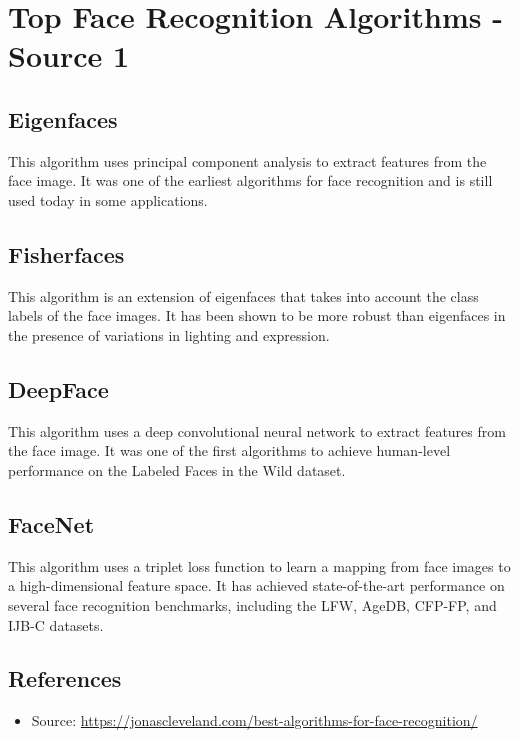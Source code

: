 \documentclass[11pt]{article}
\begin{document}



\tableofcontents
\thispagestyle{empty}
\clearpage

\setcounter{page}{1}

\section*{Top Face Recognition Algorithms - Source 1}

\subsection*{Eigenfaces}
This algorithm uses principal component analysis to extract features from the face image. It was one of the earliest algorithms for face recognition and is still used today in some applications.

\subsection*{Fisherfaces}
This algorithm is an extension of eigenfaces that takes into account the class labels of the face images. It has been shown to be more robust than eigenfaces in the presence of variations in lighting and expression.

\subsection*{DeepFace}
This algorithm uses a deep convolutional neural network to extract features from the face image. It was one of the first algorithms to achieve human-level performance on the Labeled Faces in the Wild dataset.

\subsection*{FaceNet}
This algorithm uses a triplet loss function to learn a mapping from face images to a high-dimensional feature space. It has achieved state-of-the-art performance on several face recognition benchmarks, including the LFW, AgeDB, CFP-FP, and IJB-C datasets.

\subsection*{References}
\begin{itemize}
    \item Source: \url{https://jonascleveland.com/best-algorithms-for-face-recognition/}
\end{itemize}
\end{document}

